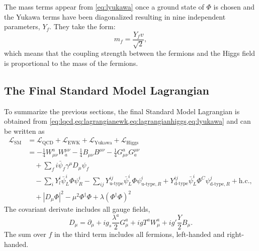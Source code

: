 The mass terms appear from \cref{eq:lyukawa} once a ground state of $\Phi$ is chosen and the Yukawa terms have been diagonalized resulting in nine independent parameters, $Y_f$. 
They take the form:
\begin{equation}
  m_f = \frac{Y_f v}{\sqrt{2}},
\end{equation}
which means that the coupling strength between the fermions and the Higgs field is proportional to the mass of the fermions.


\subsection{The Final Standard Model Lagrangian}
To summarize the previous sections, the final Standard Model Lagrangian is obtained from \cref{eq:lqcd,eq:lagrangianewk,eq:lagrangianhiggs,eq:lyukawa} and can be written as
\begin{align}
  \mathcal{L}_\text{SM} &= \mathcal{L}_\text{QCD} + \mathcal{L}_\text{EWK} + \mathcal{L}_\text{Yukawa} + \mathcal{L}_\text{Higgs} \\
   &= - \frac{1}{4}W_{\mu\nu}^aW^{\mu\nu}_{a} - \frac{1}{4} B_{\mu\nu}B^{\mu\nu} - \frac{1}{4}G_{\mu\nu}^aG^{\mu\nu}_{a} \\
   & \quad + \sum_f i \bar{\psi}_f\gamma^\mu D_\mu\psi_f \\
   & \quad - \sum_{i} Y_l^i \bar{\psi}^{i}_{L} \Phi \psi^{i}_{R} - \sum_{ij} Y_{\text{u-type}}^{ij} \bar{\psi}^{i}_{L} \Phi \psi^{i}_{\text{u-type},R} + Y_{\text{d-type}}^{ij} \bar{\psi}^{i}_{L} \Phi^C \psi^{j}_{\text{d-type}, R} + \text{h.c.},  \\
   & \quad + |D_\mu\Phi|^2 - \mu^2\Phi^\dagger\Phi + \lambda \left(\Phi^\dagger\Phi \right)^2
\end{align}
The covariant derivate includes all gauge fields,
\begin{equation}
  D_\mu = \partial_\mu + i g_s \frac{\lambda^a}{2} G_\mu^a + igT^aW_\mu^a + ig'\frac{Y}{2}B_\mu.
\end{equation}
The sum over $f$ in the third term includes all fermions, left-handed and right-handed.

